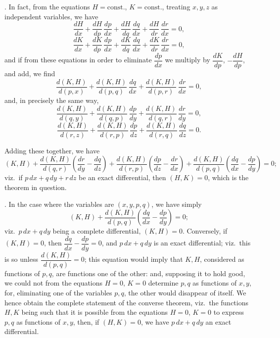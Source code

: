 \documentclass[11pt,a4paper]{article}
\begin{document}
\medskip

. In fact, from the equations $H = \text{const.}$, $K = \text{const.}$, treating $x, y, z$ as independent variables, we have
\[
\frac{dH}{dx} + \frac{dH}{dp}\,\frac{dp}{dx} + \frac{dH}{dq}\,\frac{dq}{dx} + \frac{dH}{dr}\,\frac{dr}{dx} = 0,
\]
\[
\frac{dK}{dx} + \frac{dK}{dp}\,\frac{dp}{dx} + \frac{dK}{dq}\,\frac{dq}{dx} + \frac{dK}{dr}\,\frac{dr}{dx} = 0,
\]
and if from these equations in order to eliminate $\dfrac{dp}{dx}$ we multiply by $\dfrac{dK}{dp}$, $-\dfrac{dH}{dp}$, and add, we find
\[
\frac{d(K, H)}{d(p, x)} + \frac{d(K, H)}{d(p, q)}\,\frac{dq}{dx} + \frac{d(K, H)}{d(p, r)}\,\frac{dr}{dx} = 0,
\]
and, in precisely the same way,
\[
\frac{d(K, H)}{d(q, y)} + \frac{d(K, H)}{d(q, p)}\,\frac{dp}{dy} + \frac{d(K, H)}{d(q, r)}\,\frac{dr}{dy} = 0,
\]
\[
\frac{d(K, H)}{d(r, z)} + \frac{d(K, H)}{d(r, p)}\,\frac{dp}{dz} + \frac{d(K, H)}{d(r, q)}\,\frac{dq}{dz} = 0.
\]

\newpage


Adding these together, we have
\[
(K, H) + \frac{d(K, H)}{d(q, r)}\!\left( \frac{dr}{dy} - \frac{dq}{dz} \right) + \frac{d(K, H)}{d(r, p)}\!\left( \frac{dp}{dz} - \frac{dr}{dx} \right) + \frac{d(K, H)}{d(p, q)}\!\left( \frac{dq}{dx} - \frac{dp}{dy} \right) = 0;
\]
viz.\ if $p\,dx + q\,dy + r\,dz$ be an exact differential, then $(H, K) = 0$, which is the theorem in question.

\medskip

. In the case where the variables are $(x, y, p, q)$, we have simply
\[
(K, H) + \frac{d(K, H)}{d(p, q)}\!\left( \frac{dq}{dx} - \frac{dp}{dy} \right) = 0;
\]
viz.\ $p\,dx + q\,dy$ being a complete differential, $(K, H) = 0$. Conversely, if $(K, H) = 0$, then $\dfrac{dq}{dx} - \dfrac{dp}{dy} = 0$, and $p\,dx + q\,dy$ is an exact differential; viz.\ this is so unless $\dfrac{d(K, H)}{d(p, q)} = 0$; this equation would imply that $K, H$, considered as functions of $p, q$, are functions one of the other: and, supposing it to hold good, we could not from the equations $H = 0$, $K = 0$ determine $p, q$ as functions of $x, y$, for, eliminating one of the variables $p, q$, the other would disappear of itself. We hence obtain the complete statement of the converse theorem, viz.\ the functions $H, K$ being such that it is possible from the equations $H = 0$, $K = 0$ to express $p, q$ as functions of $x, y$, then, if $(H, K) = 0$, we have $p\,dx + q\,dy$ an exact differential.
\end{document}
